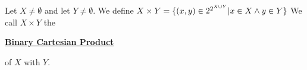 \newcommand{\BinaryCartesianProduct}[0]{
    \textbf{\hyperref[def:BinaryCartesianProduct]{Binary Cartesian Product}}
}\begin{df}
\label{def:BinaryCartesianProduct}

\rm
    Let $X \neq \emptyset$ and let 
    $Y \neq \emptyset$. 
    We define 
    $X \times Y =\{(x,y) \in 2^{2^{X \cup Y}} | x \in X \wedge y \in Y\}$
    We call 
    $X \times Y$ the 
    \BinaryCartesianProduct
    of $X$ with $Y$. 
\end{df}
